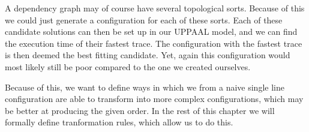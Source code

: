 A dependency graph may of course have several topological sorts. Because of this we could just generate a configuration for each of these sorts. Each of these candidate solutions can then be set up in our UPPAAL model, and we can find the execution time of their fastest trace. The configuration with the fastest trace is then deemed the best fitting candidate.  Yet, again this configuration would most likely still be poor compared to the one we created ourselves.

Because of this, we want to define ways in which we from a naive single line configuration are able to transform into more complex configurations, which may be better at producing the given order. In the rest of this chapter we will  formally define tranformation rules, which allow us to do this. 







